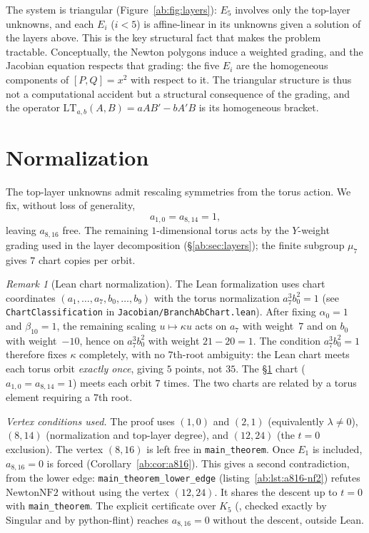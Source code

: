 \documentclass[a4paper,11pt]{article}
\newcommand{\filename}[1]{\texttt{\seqsplit{#1}}}
\theoremstyle{plain}
\theoremstyle{definition}
\theoremstyle{remark}
\newtheorem{remark}[theorem]{Remark}
\begin{document}
The system is triangular (Figure~\ref{ab:fig:layers}): $E_5$ involves only the top-layer unknowns, and each $E_i$ ($i<5$) is affine-linear in its unknowns given a solution of the layers above. This is the key structural fact that makes the problem tractable. Conceptually, the Newton polygons induce a weighted grading, and the Jacobian equation respects that grading: the five $E_i$ are the homogeneous components of $[P,Q]=x^2$ with respect to it. The triangular structure is thus not a computational accident but a structural consequence of the grading, and the operator $\mathrm{LT}_{a,b}(A,B)=aAB'-bA'B$ is its homogeneous bracket.

\section{Normalization}\label{ab:sec:normalization}

The top-layer unknowns admit rescaling symmetries from the torus action. We fix, without loss of generality,
\begin{equation}\label{ab:eq:normalization}
a_{1,0}=a_{8,14}=1,
\end{equation}
leaving $a_{8,16}$ free. The remaining $1$-dimensional torus acts by the $Y$-weight grading used in the layer decomposition (\S\ref{ab:sec:layers}); the finite subgroup $\mu_7$ gives $7$ chart copies per orbit.

\begin{remark}[Lean chart normalization]
The Lean formalization uses chart coordinates $(a_1,\dots,a_7,b_0,\dots,b_9)$ with the torus normalization $a_7^3 b_0^2 = 1$ (see \texttt{ChartClassification} in \texttt{Jacobian/BranchAbChart.lean}). After fixing $\alpha_0 = 1$ and $\beta_{10} = 1$, the remaining scaling $u \mapsto \kappa u$ acts on $a_7$ with weight~$7$ and on $b_0$ with weight~$-10$, hence on $a_7^3 b_0^2$ with weight $21 - 20 = 1$. The condition $a_7^3 b_0^2 = 1$ therefore fixes $\kappa$ completely, with no $7$th-root ambiguity: the Lean chart meets each torus orbit \emph{exactly once}, giving $5$ points, not $35$. The \S\ref{ab:sec:normalization} chart ($a_{1,0} = a_{8,14} = 1$) meets each orbit $7$ times. The two charts are related by a torus element requiring a $7$th root.
\end{remark}

\emph{Vertex conditions used.}\label{ab:sec:lower-edge} The proof uses $(1,0)$ and $(2,1)$ (equivalently $\lambda\neq0$), $(8,14)$ (normalization and top-layer degree), and $(12,24)$ (the $t=0$ exclusion). The vertex $(8,16)$ is left free in \texttt{main\_theorem}. Once $E_1$ is included, $a_{8,16}=0$ is forced (Corollary~\ref{ab:cor:a816}). This gives a second contradiction, from the lower edge: \texttt{main\_theorem\_lower\_edge} (listing~\ref{ab:lst:a816-nf2}) refutes $\mathrm{NewtonNF2}$ without using the vertex $(12,24)$. It shares the descent up to $t=0$ with \texttt{main\_theorem}. The explicit certificate over $K_5$ (\filename{scripts/a816\_certificate/}, checked exactly by {\sc Singular} and by python-flint) reaches $a_{8,16}=0$ without the descent, outside Lean.
\end{document}

